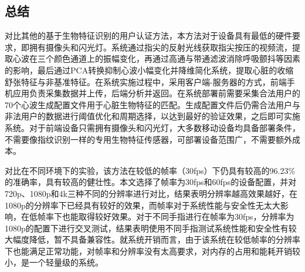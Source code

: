 %
%
%
%
%
%

\begin{conclusion}
\section{总结}
{对比其他的基于生物特征识别的用户认证方法，本方法对于设备具有最低的硬件要求，即拥有摄像头和闪光灯。系统通过指尖的反射光线获取指尖按压的视频流，提取心波在三个颜色通道上的振幅变化，再通过高通与带通滤波消除呼吸颤抖等因素的影响，最后通过PCA转换抑制心波小幅变化并降维简化系统，提取心脏的收缩舒张特征与非基准特征。在系统实施过程中，采用客户端-服务器的方式，前端手机应用负责采集数据并上传，后端分析并返回。在系统部署前需要采集合法用户的70个心波生成配置文件用于心脏生物特征的匹配。生成配置文件后仍需合法用户与非法用户的数据进行阈值优化和周期选择，以达到最好的验证效果，之后即可实施系统。对于前端设备只需拥有摄像头和闪光灯，大多数移动设备均具备部署条件，不需要像指纹识别一样的专用生物特征传感器，可部署设备范围广，不需要额外成本。}
\par
{对比在不同环境下的实验，该方法在较低的帧率（30fps）下仍具有较高的96.23\%的准确率，具有较高的健壮性。本文选择了帧率为30fps和60fps的设备配置，并对720p、1080p和4k三种不同的分辨率进行对比，结果表明分辨率越高效果越好，在1080p的分辨率下已经具有较好的效果，而帧率对于系统性能与安全性无太大影响，在低帧率下也能取得较好效果。对于不同手指进行在帧率为30fps，分辨率为1080p的配置下进行交叉测试，结果表明使用不同手指测试系统性能和安全性有较大幅度降低，暂不具备兼容性。就系统开销而言，由于该系统在较低帧率的分辨率下也能满足正常功能，对帧率和分辨率没有太高要求，对内存的占用和能耗开销较小，是一个轻量级的系统。}
{}

\end{conclusion}
